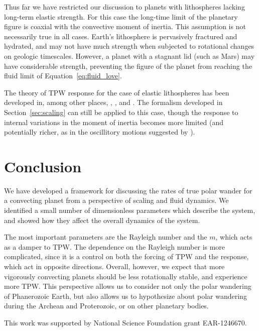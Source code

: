 \documentclass[extra,mreferee]{gji}
\begin{document}
Thus far we have restricted our discussion to planets with lithospheres lacking long-term elastic strength.
For this case the long-time limit of the planetary figure is coaxial with the convective 
moment of inertia. This assumption is not necessarily true in all cases.
Earth's lithosphere is pervasively fractured and hydrated, and may not have much strength when subjected to rotational changes on geologic timescales.
However, a planet with a stagnant lid (such as Mars) may have considerable strength, preventing the figure of the planet 
from reaching the fluid limit of Equation~\eqref{eq:fluid_love}.

The theory of TPW response for the case of elastic lithospheres has been developed in, among other places, 
\citet{matsuyama2006rotational}, \citet{creveling2012mechanisms}, and \citet{chan2014time}.
The formalism developed in Section~\ref{sec:scaling} can still be applied to this case, 
though the response to internal variations in the moment of inertia becomes more limited 
(and potentially richer, as in the oscillitory motions suggested by \citet{creveling2012mechanisms}).

\section{Conclusion}
We have developed a framework for discussing the rates of true polar wander for a convecting planet 
from a perspective of scaling and fluid dynamics.
We identified a small number of dimensionless parameters which describe the system, and showed how they affect the overall dynamics of the system.

The most important parameters are the Rayleigh number and the $m$, which acts as a damper to TPW.
The dependence on the Rayleigh number is more complicated, since it is a control on both the forcing 
of TPW and the response, which act in opposite directions.
Overall, however, we expect that more vigorously convecting planets should be less rotationally stable, and experience more TPW.
This perspective allows us to consider not only the polar wandering of Phanerozoic Earth,
but also allows us to hypothesize about polar wandering during the Archean and Proterozoic, or 
on other planetary bodies.

\begin{acknowledgments}
This work was supported by National Science Foundation grant EAR-1246670.
\end{acknowledgments}



\end{document}
